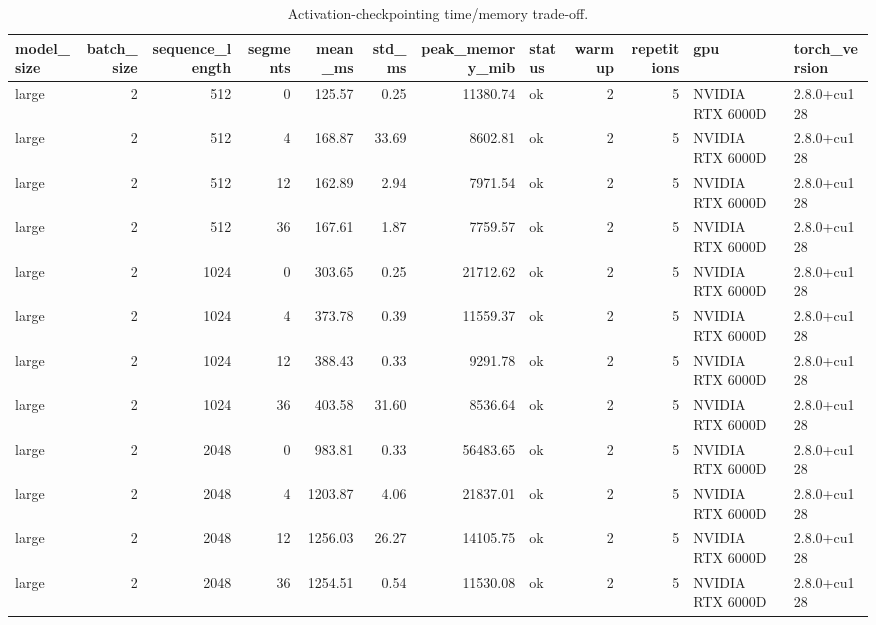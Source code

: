 \begin{table}
\caption{Activation-checkpointing time/memory trade-off.}
\label{tab:checkpoint-measured}
\begin{tabular}{lrrrrrrlrrll}
\toprule
model_size & batch_size & sequence_length & segments & mean_ms & std_ms & peak_memory_mib & status & warmup & repetitions & gpu & torch_version \\
\midrule
large & 2 & 512 & 0 & 125.57 & 0.25 & 11380.74 & ok & 2 & 5 & NVIDIA RTX 6000D & 2.8.0+cu128 \\
large & 2 & 512 & 4 & 168.87 & 33.69 & 8602.81 & ok & 2 & 5 & NVIDIA RTX 6000D & 2.8.0+cu128 \\
large & 2 & 512 & 12 & 162.89 & 2.94 & 7971.54 & ok & 2 & 5 & NVIDIA RTX 6000D & 2.8.0+cu128 \\
large & 2 & 512 & 36 & 167.61 & 1.87 & 7759.57 & ok & 2 & 5 & NVIDIA RTX 6000D & 2.8.0+cu128 \\
large & 2 & 1024 & 0 & 303.65 & 0.25 & 21712.62 & ok & 2 & 5 & NVIDIA RTX 6000D & 2.8.0+cu128 \\
large & 2 & 1024 & 4 & 373.78 & 0.39 & 11559.37 & ok & 2 & 5 & NVIDIA RTX 6000D & 2.8.0+cu128 \\
large & 2 & 1024 & 12 & 388.43 & 0.33 & 9291.78 & ok & 2 & 5 & NVIDIA RTX 6000D & 2.8.0+cu128 \\
large & 2 & 1024 & 36 & 403.58 & 31.60 & 8536.64 & ok & 2 & 5 & NVIDIA RTX 6000D & 2.8.0+cu128 \\
large & 2 & 2048 & 0 & 983.81 & 0.33 & 56483.65 & ok & 2 & 5 & NVIDIA RTX 6000D & 2.8.0+cu128 \\
large & 2 & 2048 & 4 & 1203.87 & 4.06 & 21837.01 & ok & 2 & 5 & NVIDIA RTX 6000D & 2.8.0+cu128 \\
large & 2 & 2048 & 12 & 1256.03 & 26.27 & 14105.75 & ok & 2 & 5 & NVIDIA RTX 6000D & 2.8.0+cu128 \\
large & 2 & 2048 & 36 & 1254.51 & 0.54 & 11530.08 & ok & 2 & 5 & NVIDIA RTX 6000D & 2.8.0+cu128 \\
\bottomrule
\end{tabular}
\end{table}

